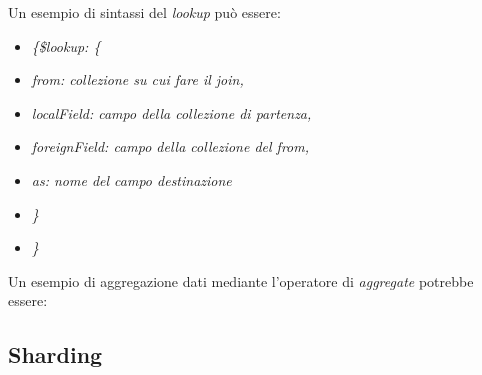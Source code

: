 \documentclass{article}
\begin{document}
Un esempio di sintassi del \textit{lookup} può essere:
\begin{itemize}[label={ }, leftmargin=1cm]
    \itemsep0em
    \item \textit{\{\$lookup: \{}
    \item \quad \textit{from: collezione su cui fare il join,}
    \item \quad \textit{localField: campo della collezione di partenza,}
    \item \quad \textit{foreignField: campo della collezione del from,}
    \item \quad \textit{as: nome del campo destinazione}
    \item \quad \textit{\}}
    \item \textit{\}}
\end{itemize}
Un esempio di aggregazione dati mediante l'operatore di \textit{aggregate} potrebbe essere:

\subsection*{Sharding}
\large
\end{document}
